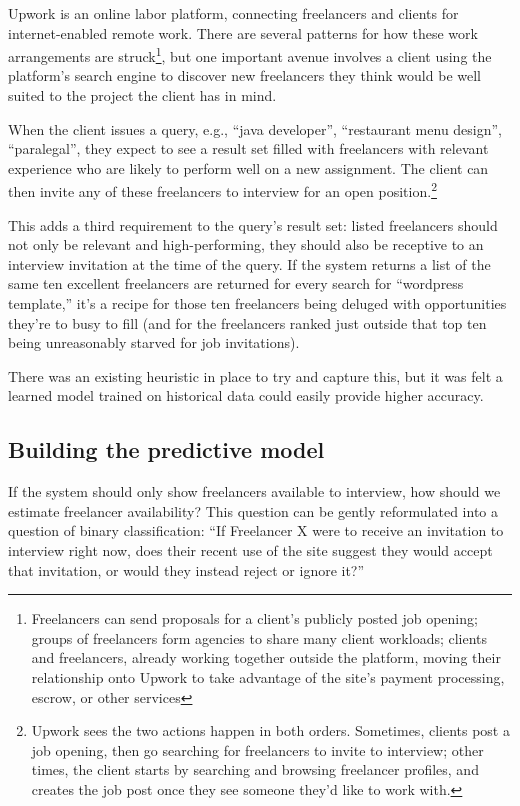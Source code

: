 \documentclass{article}
\begin{document}
 Upwork is an online labor platform, connecting freelancers and clients for
internet-enabled remote work. There are several patterns for how these work
arrangements are struck\footnote{Freelancers can send proposals for a client's
publicly posted job opening; groups of freelancers form agencies to share many
client workloads; clients and freelancers, already working together outside the
platform, moving their relationship onto Upwork to take advantage of the site's
payment processing, escrow, or other services}, but one important avenue
involves a client using the platform's search engine to discover new freelancers
they think would be well suited to the project the client has in mind.

 When the client issues a query, e.g., ``java developer'', ``restaurant menu
design'', ``paralegal'', they expect to see a result set filled with freelancers
with relevant experience who are likely to perform well on a new assignment. The
client can then invite any of these freelancers to interview for an open
position.\footnote{Upwork sees the two actions happen in both orders. Sometimes,
clients post a job opening, then go searching for freelancers to invite to
interview; other times, the client starts by searching and browsing freelancer
profiles, and creates the job post once they see someone they'd like to work
with.}

 This adds a third requirement to the query's result set: listed freelancers
should not only be relevant and high-performing, they should also be receptive
to an interview invitation at the time of the query. If the system returns a
list of the same ten excellent freelancers are returned for every search for
``wordpress template,'' it's a recipe for those ten freelancers being deluged
with opportunities they're to busy to fill (and for the freelancers ranked just
outside that top ten being unreasonably starved for job invitations).

 There was an existing heuristic in place to try and capture this, but it was
felt a learned model trained on historical data could easily provide higher
accuracy.

\subsection{Building the predictive model}

 If the system should only show freelancers available to interview, how should
we estimate freelancer availability? This question can be gently reformulated
into a question of binary classification: ``If Freelancer X were to receive an
invitation to interview right now, does their recent use of the site suggest
they would accept that invitation, or would they instead reject or ignore it?''
\end{document}
